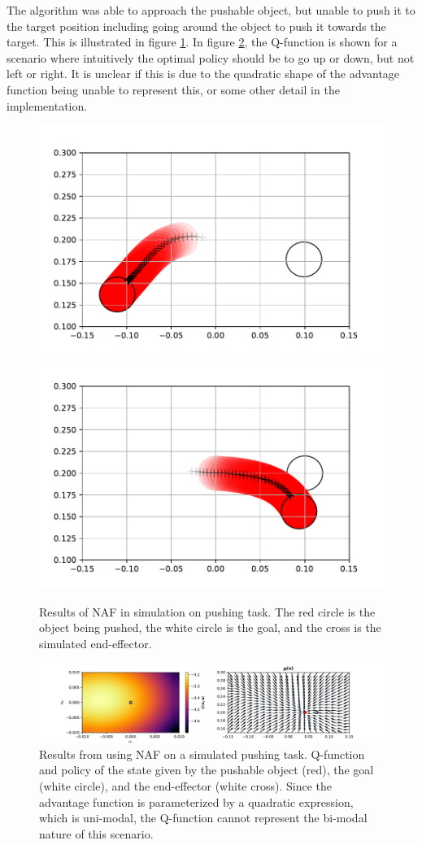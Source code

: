 The algorithm was able to approach the pushable object, but unable to push it
to the target position including going around the object to push it towards the
target. This is illustrated in figure \ref{fig:naf_sim_failure}. In figure
\ref{fig:naf_sim_unimode_q}, the Q-function is shown for a scenario where
intuitively the optimal policy should be to go up or down, but not left or
right. It is unclear if this is due to the quadratic shape of the advantage
function being unable to represent this, or some other detail in the
implementation.

\begin{figure}[h!]
    \centering
    \includegraphics[width=0.4 \textwidth]{res/naf_sim_failure_mode.pdf}
    \includegraphics[width=0.4 \textwidth]{res/naf_sim_failure_mode_ideal.pdf}

    \caption{Results of NAF in simulation on pushing task. The red circle is
    the object being pushed, the white circle is the goal, and the cross is the
    simulated end-effector.}

    \label{fig:naf_sim_failure}
\end{figure}

\begin{figure}[h!]
    \centering
    \includegraphics[width=1.0 \textwidth]{res/naf_sim_unimode_q.pdf}

    \caption{Results from using NAF on a simulated pushing task. Q-function and
    policy of the state given by the pushable object (red), the goal (white
    circle), and the end-effector (white cross). Since the advantage function
    is parameterized by a quadratic expression, which is uni-modal, the
    Q-function cannot represent the bi-modal nature of this scenario.}

    \label{fig:naf_sim_unimode_q}
\end{figure}

